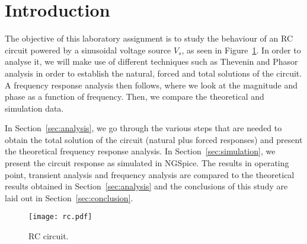 \section{Introduction}
\label{sec:introduction}
The objective of this laboratory assignment is to study the behaviour of an RC circuit powered by a sinusoidal voltage source $V_{s}$, as seen in Figure~\ref{fig:rc}. In order to analyse it, we will make use of different techniques such as Thevenin and Phasor analysis in order to establish the natural, forced and total solutions of the circuit. A frequency response analysis then follows, where we look at the magnitude and phase as a function of frequency. Then, we compare the theoretical and simulation data.

In Section~\ref{sec:analysis}, we go through the various steps that are needed to obtain the total solution of the circuit (natural plus forced responses) and present the theoretical frequency response analysis.
In Section~\ref{sec:simulation}, we present the circuit response as simulated in NGSpice. The results in operating point, transient analysis and frequency analysis are compared to the theoretical results obtained in Section~\ref{sec:analysis} and the conclusions of this study are laid out in
Section~\ref{sec:conclusion}.

\begin{figure}[h] \centering
\texttt{[image: rc.pdf]}
\caption{RC circuit.}
\label{fig:rc}
\end{figure}

